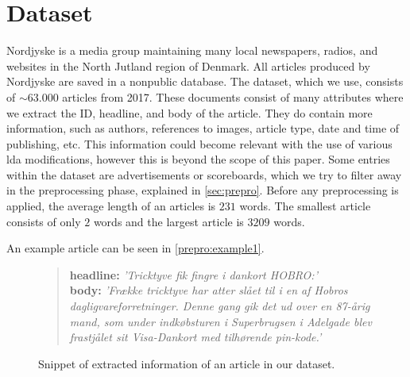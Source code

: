 \section{Dataset}\label{sec:dataset}
Nordjyske is a media group maintaining many local newspapers, radios, and websites in the North Jutland region of Denmark.
All articles produced by Nordjyske are saved in a nonpublic database.
The dataset, which we use, consists of $\sim$$63.000$ articles from 2017.
These documents consist of many attributes where we extract the ID, headline, and body of the article.
They do contain more information, such as authors, references to images, article type, date and time of publishing, etc.
This information could become relevant with the use of various \gls{lda} modifications, however this is beyond the scope of this paper.
Some entries within the dataset are advertisements or scoreboards, which we try to filter away in the preprocessing phase, explained in \autoref{sec:prepro}.
Before any preprocessing is applied, the average length of an articles is $231$ words.
The smallest article consists of only $2$ words and the largest article is $3209$ words.

An example article can be seen in \autoref{prepro:example1}.

\begin{figure}[h]
	\begin{framed}
		\begin{quote}
			\textbf{headline:} \textit{'Tricktyve fik fingre i dankort HOBRO:'}\\
			\textbf{body:} \textit{'Frække tricktyve har atter slået til i en af Hobros dagligvareforretninger. Denne gang gik det ud over en 87-årig mand, som under indkøbsturen i Superbrugsen i Adelgade blev frastjålet sit Visa-Dankort med tilhørende pin-kode.'}
		\end{quote}
	\end{framed}
		\caption{Snippet of extracted information of an article in our dataset.}
		\label{prepro:example1}
\end{figure}